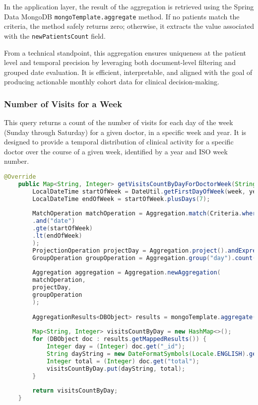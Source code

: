 In the application layer, the result of the aggregation is retrieved using the Spring Data MongoDB \texttt{mongoTemplate.aggregate} method. If no patients match the criteria, the method safely returns zero; otherwise, it extracts the value associated with the \texttt{newPatientsCount} field.

From a technical standpoint, this aggregation ensures uniqueness at the patient level and temporal precision by leveraging both document-level filtering and grouped date evaluation. It is efficient, interpretable, and aligned with the goal of producing actionable monthly cohort data for clinical decision-making.

\subsubsection{Number of Visits for a Week}
This query returns a count of the number of visits for each day of the week (Sunday through Saturday) for a given doctor, in a specific week and year. It is designed to provide a temporal distribution of clinical activity for a specific doctor over the course of a given week, identified by a year and ISO week number. 

\begin{lstlisting}[language=java, caption={Java code for the Number of Visits in a Week analytic}]
	@Override
	public Map<String, Integer> getVisitsCountByDayForDoctorWeek(String doctorId, Integer week, Integer year) {
		LocalDateTime startOfWeek = DateUtil.getFirstDayOfWeek(week, year).atStartOfDay();
		LocalDateTime endOfWeek = startOfWeek.plusDays(7);
		
		MatchOperation matchOperation = Aggregation.match(Criteria.where("doctor.id").is(doctorId)
		.and("date")
		.gte(startOfWeek)
		.lt(endOfWeek)
		);
		ProjectionOperation projectDay = Aggregation.project().andExpression("dayOfWeek(date)").as("day");
		GroupOperation groupOperation = Aggregation.group("day").count().as("total");
		
		Aggregation aggregation = Aggregation.newAggregation(
		matchOperation,
		projectDay,
		groupOperation
		);
		
		AggregationResults<DBObject> results = mongoTemplate.aggregate(aggregation, Appointment.class, DBObject.class);
		
		Map<String, Integer> visitsCountByDay = new HashMap<>();
		for (DBObject doc : results.getMappedResults()) {
			Integer day = (Integer) doc.get("_id");
			String dayString = new DateFormatSymbols(Locale.ENGLISH).getWeekdays()[day].toLowerCase();
			Integer total = (Integer) doc.get("total");
			visitsCountByDay.put(dayString, total);
		}
		
		return visitsCountByDay;
	}
\end{lstlisting}

